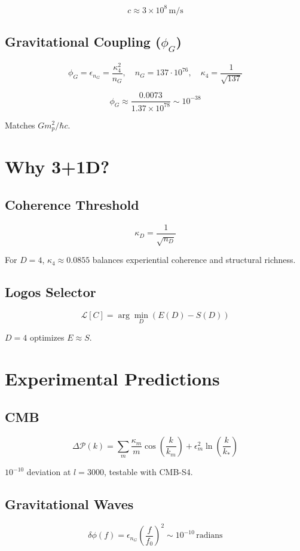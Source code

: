 \documentclass[12pt]{article}
\begin{document}
\[
c \approx 3 \times 10^8 \, \text{m/s}
\]

\subsection{Gravitational Coupling (\(\phi_G\))}
\[
\phi_G = \epsilon_{n_G} = \frac{\kappa_4^2}{n_G}, \quad n_G = 137 \cdot 10^{76}, \quad \kappa_4 = \frac{1}{\sqrt{137}}
\]

\[
\phi_G \approx \frac{0.0073}{1.37 \times 10^{78}} \sim 10^{-38}
\]

Matches \(G m_p^2 / \hbar c\).

\section{Why 3+1D?}

\subsection{Coherence Threshold}
\[
\kappa_D = \frac{1}{\sqrt{n_D}}
\]

For \(D = 4\), \(\kappa_4 \approx 0.0855\) balances experiential coherence and structural richness.

\subsection{Logos Selector}
\[
\mathcal{L}[C] = \arg\min_D (E(D) - S(D))
\]

\(D = 4\) optimizes \(E \approx S\).

\section{Experimental Predictions}

\subsection{CMB}
\[
\Delta \mathcal{P}(k) = \sum_m \frac{\kappa_m}{m} \cos\left(\frac{k}{k_m}\right) + \epsilon_m^2 \ln\left(\frac{k}{k_*}\right)
\]

\(10^{-10}\) deviation at \(l = 3000\), testable with CMB-S4.

\subsection{Gravitational Waves}
\[
\delta \phi(f) = \epsilon_{n_G} \left( \frac{f}{f_0} \right)^2 \sim 10^{-10} \, \text{radians}
\]
\end{document}
